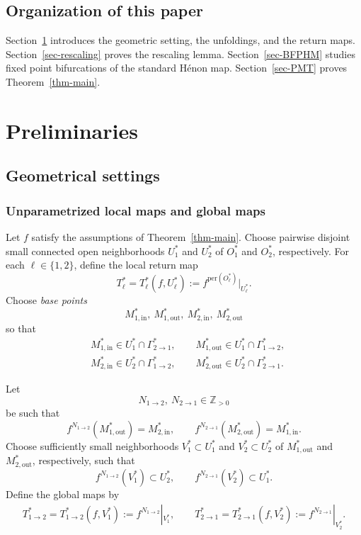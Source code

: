 \documentclass[11pt,a4paper]{article}
\theoremstyle{plain}
\theoremstyle{definition}
\theoremstyle{plain}
\numberwithin{equation}{section}
\begin{document}
\subsection{Organization of this paper}

Section~\ref{sec-prelim} introduces the geometric setting, the unfoldings, and the return maps. Section~\ref{sec-rescaling} proves the rescaling lemma. Section~\ref{sec-BFPHM} studies fixed point bifurcations of the standard H\'enon map. Section~\ref{sec-PMT} proves Theorem~\ref{thm-main}.
\section{Preliminaries}
\label{sec-prelim}

\subsection{Geometrical settings}
\label{sec-GS}

\subsubsection{Unparametrized local maps and global maps}

Let $f$ satisfy the assumptions of Theorem~\ref{thm-main}. Choose pairwise disjoint small connected open neighborhoods $U_1^*$ and $U_2^*$ of $O_1^*$ and $O_2^*$, respectively. For each $\ell \in \{1,2\}$, define the local return map
\[
T_\ell^* = T_\ell^*(f,U_\ell^*) := f^{\mathrm{per}(O_\ell^*)}|_{U_\ell^*}.
\]
Choose \emph{base points}
\[
M_{1,\mathrm{in}}^*,\ M_{1,\mathrm{out}}^*,\ M_{2,\mathrm{in}}^*,\ M_{2,\mathrm{out}}^*
\]
so that
\begin{align*}
&M_{1,\mathrm{in}}^* \in U_1^* \cap \Gamma_{2 \to 1}^*, \qquad
M_{1,\mathrm{out}}^* \in U_1^* \cap \Gamma_{1 \to 2}^*, \\
&M_{2,\mathrm{in}}^* \in U_2^* \cap \Gamma_{1 \to 2}^*, \qquad
M_{2,\mathrm{out}}^* \in U_2^* \cap \Gamma_{2 \to 1}^*.
\end{align*}

Let
\[
N_{1 \to 2},\ N_{2 \to 1} \in \mathbb{Z}_{>0}
\]
be such that
\[
f^{N_{1 \to 2}}(M_{1,\mathrm{out}}^*) = M_{2,\mathrm{in}}^*,
\qquad
f^{N_{2 \to 1}}(M_{2,\mathrm{out}}^*) = M_{1,\mathrm{in}}^*.
\]
Choose sufficiently small neighborhoods $V_1^* \subset U_1^*$ and $V_2^* \subset U_2^*$ of $M_{1,\mathrm{out}}^*$ and $M_{2,\mathrm{out}}^*$, respectively, such that
\[
f^{N_{1 \to 2}}(V_1^*) \subset U_2^*,
\qquad
f^{N_{2 \to 1}}(V_2^*) \subset U_1^*.
\]
Define the global maps by
\begin{align*}
T_{1 \to 2}^* = T_{1 \to 2}^*(f, V_1^*) := f^{N_{1 \to 2}}|_{V_1^*},
\qquad
T_{2 \to 1}^* = T_{2 \to 1}^*(f, V_2^*) := f^{N_{2 \to 1}}|_{V_2^*}.
\end{align*}
\end{document}
